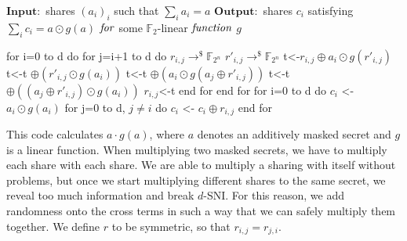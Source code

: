 \documentclass[english, version-2020-11]{uzl-thesis}
\begin{document}
 \begin{Pseudocode}[caption={Secure Evaluation of $h:x \odot g(x)$ for additive sharing}, label={alg:additivesharing}]
$\mathbf{Input:}$ shares $(a_i)_i$ such that $\sum_{i} a_i =a$
$\mathbf{Output:}$ shares $c_i$ satisfying $\sum_i c_i = a \odot g(a)$ $\text{\textit{for}}$ some $\mathbb{F}_2$-linear $\text{\textit{function}}$ $g$

for i=0 to d do 
  for j=i+1 to d do
    $r_{i,j} \rightarrow ^{\$} \mathbb{F}_{2^n}$
    $r'_{i,j} \rightarrow ^{\$} \mathbb{F}_{2^n}$
    t<-$r_{i,j} \oplus a_i \odot g(r'_{i,j})$
    t<-t $\oplus (r'_{i,j}\odot g(a_i))$
    t<-t $\oplus (a_i \odot g(a_j\oplus r'_{i,j}))$
    t<-t $\oplus ((a_j \oplus r'_{i,j})\odot g(a_i))$
    $r_{i,j}$<-t
  end for
end for
for i=0 to d do
    $c_i$ <- $a_i \odot g(a_i)$
    for j=0 to d, $j\neq i$ do $c_i$ <- $c_i \oplus r_{i,j}$
end for
    \end{Pseudocode}

   

This code calculates $a \cdot g(a)$, where $a$ denotes an additively masked secret and $g$ is a linear function. When multiplying two masked secrets, we have to multiply each share with each share. We are able to multiply a sharing with itself without problems, but once we start multiplying different shares to the same secret, we reveal too much information and break $d$-SNI. For this reason, we add randomness onto the cross terms in such a way that we can safely multiply them together. We define $r$ to be symmetric, so that $r_{i,j}=r_{j,i}$.
\end{document}

